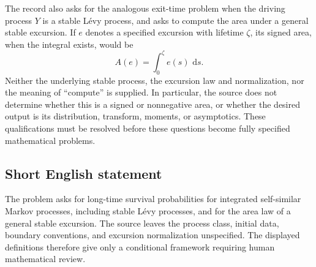 \documentclass[11pt]{article}
\newcommand{\dd}{\,\mathrm{d}}
\begin{document}
The record also asks for the analogous exit-time problem when the driving process \(Y\) is a stable L\'evy process, and asks to compute the area under a general stable excursion. If \(e\) denotes a specified excursion with lifetime \(\zeta\), its signed area, when the integral exists, would be
\[
 A(e)=\int_0^{\zeta}e(s)\,\dd s.
\]
Neither the underlying stable process, the excursion law and normalization, nor the meaning of ``compute'' is supplied. In particular, the source does not determine whether this is a signed or nonnegative area, or whether the desired output is its distribution, transform, moments, or asymptotics. These qualifications must be resolved before these questions become fully specified mathematical problems.
\subsection{Short English statement}
The problem asks for long-time survival probabilities for integrated self-similar Markov processes, including stable L\'evy processes, and for the area law of a general stable excursion. The source leaves the process class, initial data, boundary conventions, and excursion normalization unspecified. The displayed definitions therefore give only a conditional framework requiring human mathematical review.
\end{document}
